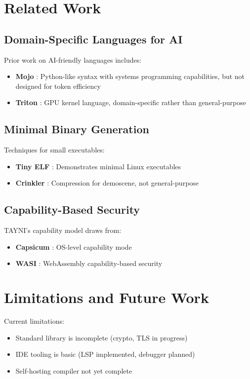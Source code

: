 \documentclass[11pt,a4paper]{article}
\begin{document}
\section{Related Work}

\subsection{Domain-Specific Languages for AI}

Prior work on AI-friendly languages includes:
\begin{itemize}
    \item \textbf{Mojo} \cite{mojo}: Python-like syntax with systems programming capabilities, but not designed for token efficiency
    \item \textbf{Triton} \cite{triton}: GPU kernel language, domain-specific rather than general-purpose
\end{itemize}

\subsection{Minimal Binary Generation}

Techniques for small executables:
\begin{itemize}
    \item \textbf{Tiny ELF} \cite{tinyelf}: Demonstrates minimal Linux executables
    \item \textbf{Crinkler} \cite{crinkler}: Compression for demoscene, not general-purpose
\end{itemize}

\subsection{Capability-Based Security}

TAYNI's capability model draws from:
\begin{itemize}
    \item \textbf{Capsicum} \cite{capsicum}: OS-level capability mode
    \item \textbf{WASI} \cite{wasi}: WebAssembly capability-based security
\end{itemize}

\section{Limitations and Future Work}

Current limitations:
\begin{itemize}
    \item Standard library is incomplete (crypto, TLS in progress)
    \item IDE tooling is basic (LSP implemented, debugger planned)
    \item Self-hosting compiler not yet complete
\end{itemize}
\end{document}

